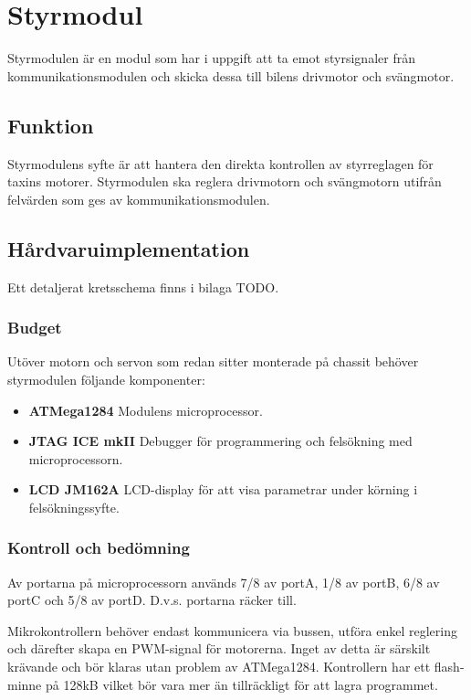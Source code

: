 \documentclass[designspec/spec.tex]{subfiles}
\begin{document}
\section{Styrmodul}
Styrmodulen är en modul som har i uppgift att ta emot styrsignaler från
kommunikationsmodulen och skicka dessa till bilens drivmotor och svängmotor.

\subsection{Funktion}
Styrmodulens syfte är att hantera den direkta kontrollen av styrreglagen för
taxins motorer. Styrmodulen ska reglera drivmotorn och svängmotorn utifrån
felvärden som ges av kommunikationsmodulen.

\subsection{Hårdvaruimplementation}
Ett detaljerat kretsschema finns i bilaga TODO.

\subsubsection{Budget}
Utöver motorn och servon som redan sitter monterade på chassit behöver
styrmodulen följande komponenter:

\begin{itemize}
	\item \textbf{ATMega1284} Modulens microprocessor. 
    \item \textbf{JTAG ICE mkII} Debugger för programmering och felsökning med
    microprocessorn. 
    \item \textbf{LCD JM162A} LCD-display för att visa parametrar under körning
    i felsökningssyfte.
\end{itemize}

\subsubsection{Kontroll och bedömning}
Av portarna på microprocessorn används 7/8 av portA, 1/8 av portB, 6/8 av portC
och 5/8 av portD. D.v.s. portarna räcker till.

Mikrokontrollern behöver endast kommunicera via bussen, utföra enkel reglering
och därefter skapa en PWM-signal för motorerna. Inget av detta är särskilt
krävande och bör klaras utan problem av ATMega1284. Kontrollern har ett
flash-minne på 128kB vilket bör vara mer än tillräckligt för att lagra
programmet.
\end{document}
